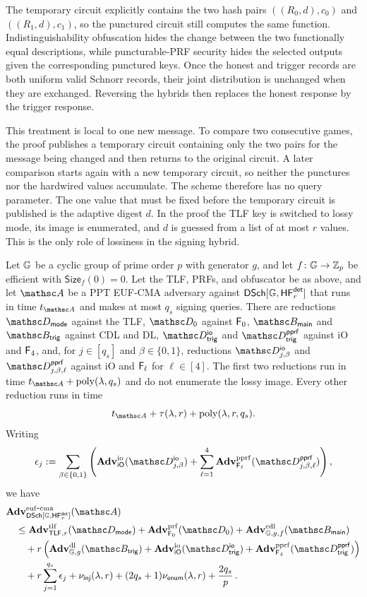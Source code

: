 The temporary circuit explicitly contains the two hash pairs $((R_0,d),c_0)$ and $((R_1,d),c_1)$, so the punctured circuit still computes the same function. Indistinguishability obfuscation hides the change between the two functionally equal descriptions, while puncturable-PRF security hides the selected outputs given the corresponding punctured keys. Once the honest and trigger records are both uniform valid Schnorr records, their joint distribution is unchanged when they are exchanged. Reversing the hybrids then replaces the honest response by the trigger response.

This treatment is local to one new message. To compare two consecutive games, the proof publishes a temporary circuit containing only the two pairs for the message being changed and then returns to the original circuit. A later comparison starts again with a new temporary circuit, so neither the punctures nor the hardwired values accumulate. The scheme therefore has no query parameter. The one value that must be fixed before the temporary circuit is published is the adaptive digest $d$. In the proof the TLF key is switched to lossy mode, its image is enumerated, and $d$ is guessed from a list of at most $r$ values. This is the only role of lossiness in the signing hybrid.

\begin{theorem} \label{thm-der-adaptive}
Let $\mathbb{G}$ be a cyclic group of prime order $p$ with generator $g$, and let $f\colon\mathbb{G}\to\mathbb Z_p$ be efficient with $\mathsf{Size}_f(0)=0$. Let the TLF, PRFs, and obfuscator be as above, and let $\advA$ be a PPT EUF-CMA adversary against $\mathsf{DSch}[\mathbb{G},\mathsf{HF}^{\mathsf{det}}_r]$ that runs in time $t_{\advA}$ and makes at most $q_s$ signing queries. There are reductions $\advD_{\mathsf{mode}}$ against the TLF, $\advD_0$ against $\mathsf{F}_0$, $\advB_{\mathsf{main}}$ and $\advB_{\mathsf{trig}}$ against CDL and DL, $\advD^{\mathsf{io}}_{\mathsf{trig}}$ and $\advD^{\mathsf{pprf}}_{\mathsf{trig}}$ against iO and $\mathsf{F}_4$, and, for $j\in[q_s]$ and $\beta\in\{0,1\}$, reductions $\advD^{\mathsf{io}}_{j,\beta}$ and $\advD^{\mathsf{pprf}}_{j,\beta,\ell}$ against iO and $\mathsf{F}_\ell$ for $\ell\in[4]$. The first two reductions run in time $t_{\advA}+\poly(\secp,q_s)$ and do not enumerate the lossy image. Every other reduction runs in time
$$
t_{\advA}+\tau(\secp,r)+\poly(\secp,r,q_s).
$$
Writing
$$
\epsilon_j
:=
\sum_{\beta\in\{0,1\}}
\left(
\AdvIO{\iO}{\advD^{\mathsf{io}}_{j,\beta}}
+\sum_{\ell=1}^{4}\AdvPPRF{\PRF_\ell}{\advD^{\mathsf{pprf}}_{j,\beta,\ell}}
\right),
$$
we have
$$
\begin{aligned}
&\AdvEUFCMA{\SchDScheme[\GG,\HF^{\mathsf{det}}_r]}{\advA}\\
&\quad\le
\AdvTLF{\TLF,r}{\advD_{\mathsf{mode}}}
+\AdvPRF{\PRF_0}{\advD_0}
+\AdvCDL{\GG,g,f}{\advB_{\mathsf{main}}}\\
&\qquad+r\left(
\AdvDL{\GG,g}{\advB_{\mathsf{trig}}}
+\AdvIO{\iO}{\advD^{\mathsf{io}}_{\mathsf{trig}}}
+\AdvPPRF{\PRF_4}{\advD^{\mathsf{pprf}}_{\mathsf{trig}}}
\right)\\
&\qquad+r\sum_{j=1}^{q_s}\epsilon_j
+\nu_{\mathsf{inj}}(\secp,r)
+(2q_s+1)\nu_{\mathsf{enum}}(\secp,r)
+\frac{2q_s}{p} \, .
\end{aligned}
$$
\end{theorem}

